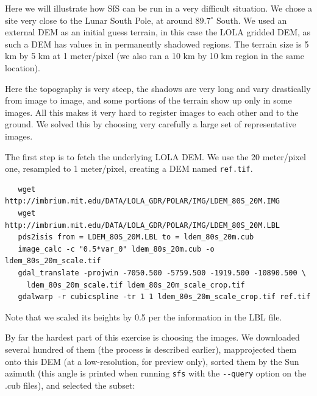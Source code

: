 Here we will illustrate how SfS can be run in a very difficult
situation. We chose a site very close to the Lunar South Pole, at around
$89.7^\circ$ South. We used an external DEM as an initial guess terrain,
in this case the LOLA gridded DEM, as such a DEM has values in in
permanently shadowed regions. The terrain size is 5 km by 5 km at 1
meter/pixel (we also ran a 10 km by 10 km region in the same location).

Here the topography is very steep, the shadows are very long and vary
drastically from image to image, and some portions of the terrain show
up only in some images. All this makes it very hard to register images
to each other and to the ground. We solved this by choosing very carefully
a large set of representative images. 

The first step is to fetch the underlying LOLA DEM. We use the 20
meter/pixel one, resampled to 1 meter/pixel, creating a DEM
named \texttt{ref.tif}.

\begin{verbatim}
   wget http://imbrium.mit.edu/DATA/LOLA_GDR/POLAR/IMG/LDEM_80S_20M.IMG
   wget http://imbrium.mit.edu/DATA/LOLA_GDR/POLAR/IMG/LDEM_80S_20M.LBL
   pds2isis from = LDEM_80S_20M.LBL to = ldem_80s_20m.cub
   image_calc -c "0.5*var_0" ldem_80s_20m.cub -o ldem_80s_20m_scale.tif
   gdal_translate -projwin -7050.500 -5759.500 -1919.500 -10890.500 \
     ldem_80s_20m_scale.tif ldem_80s_20m_scale_crop.tif
   gdalwarp -r cubicspline -tr 1 1 ldem_80s_20m_scale_crop.tif ref.tif
\end{verbatim}

Note that we scaled its heights by 0.5 per the information in the LBL file.

By far the hardest part of this exercise is choosing the images. We
downloaded several hundred of them (the process is described earlier),
mapprojected them onto this DEM (at a low-resolution, for preview only),
sorted them by the Sun azimuth (this angle is printed when running
\texttt{sfs} with the \texttt{-\/-query} option on the .cub files), and selected the subset:

